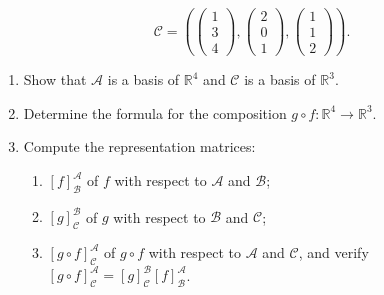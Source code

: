 \begin{exercise}
\[\mathcal{C} = \left( \begin{pmatrix} 1 \\ 3 \\ 4 \end{pmatrix}, \begin{pmatrix} 2 \\ 0 \\ 1 \end{pmatrix}, \begin{pmatrix} 1 \\ 1 \\ 2 \end{pmatrix} \right).
\]
\begin{enumerate}
    \item Show that $\mathcal{A}$ is a basis of $\mathbb{R}^4$ and $\mathcal{C}$ is a basis of $\mathbb{R}^3$.
    \item Determine the formula for the composition $g \circ f \colon \mathbb{R}^4 \to \mathbb{R}^3$.
    \item Compute the representation matrices:
    \begin{enumerate}[label=\textbf{(\roman*)}]
        \item $[f]_{\mathcal{B}}^{\mathcal{A}}$ of $f$ with respect to $\mathcal{A}$ and $\mathcal{B}$;
        \item $[g]_{\mathcal{C}}^{\mathcal{B}}$ of $g$ with respect to $\mathcal{B}$ and $\mathcal{C}$;
        \item $[g \circ f]_{\mathcal{C}}^{\mathcal{A}}$ of $g \circ f$ with respect to $\mathcal{A}$ and $\mathcal{C}$, and verify $[g \circ f]_{\mathcal{C}}^{\mathcal{A}} = [g]_{\mathcal{C}}^{\mathcal{B}} [f]_{\mathcal{B}}^{\mathcal{A}}$.
    \end{enumerate}
\end{enumerate}
\end{exercise}



